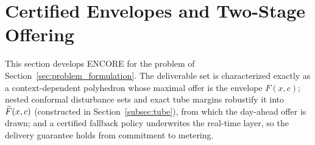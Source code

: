 \section{Certified Envelopes and Two-Stage Offering}
\label{sec:methodology}

This section develops ENCORE for the problem of
Section~\ref{sec:problem_formulation}. The deliverable set is characterized
exactly as a context-dependent polyhedron whose maximal offer is the envelope
$F(x,c)$; nested conformal disturbance sets and exact tube margins robustify
it into $\widetilde{F}(x,c)$ (constructed in Section~\ref{subsec:tube}), from which the
day-ahead offer is drawn; and a certified
fallback policy underwrites the real-time layer, so the delivery guarantee
holds from commitment to metering.

